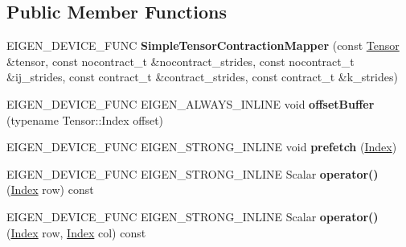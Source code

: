 \subsection*{Public Member Functions}
\begin{DoxyCompactItemize}
\item 
\mbox{\label{class_eigen_1_1internal_1_1_simple_tensor_contraction_mapper_a4804dcac1379d2ac369c498ba78dd17f}} 
E\+I\+G\+E\+N\+\_\+\+D\+E\+V\+I\+C\+E\+\_\+\+F\+U\+NC {\bfseries Simple\+Tensor\+Contraction\+Mapper} (const \hyperlink{class_eigen_1_1_tensor}{Tensor} \&tensor, const nocontract\+\_\+t \&nocontract\+\_\+strides, const nocontract\+\_\+t \&ij\+\_\+strides, const contract\+\_\+t \&contract\+\_\+strides, const contract\+\_\+t \&k\+\_\+strides)
\item 
\mbox{\label{class_eigen_1_1internal_1_1_simple_tensor_contraction_mapper_a8ac62af57a8eda84f7b792c9e98df4b0}} 
E\+I\+G\+E\+N\+\_\+\+D\+E\+V\+I\+C\+E\+\_\+\+F\+U\+NC E\+I\+G\+E\+N\+\_\+\+A\+L\+W\+A\+Y\+S\+\_\+\+I\+N\+L\+I\+NE void {\bfseries offset\+Buffer} (typename Tensor\+::\+Index offset)
\item 
\mbox{\label{class_eigen_1_1internal_1_1_simple_tensor_contraction_mapper_acb247a9e53f1b0d7ba2b8b35ac2ad166}} 
E\+I\+G\+E\+N\+\_\+\+D\+E\+V\+I\+C\+E\+\_\+\+F\+U\+NC E\+I\+G\+E\+N\+\_\+\+S\+T\+R\+O\+N\+G\+\_\+\+I\+N\+L\+I\+NE void {\bfseries prefetch} (\hyperlink{namespace_eigen_a62e77e0933482dafde8fe197d9a2cfde}{Index})
\item 
\mbox{\label{class_eigen_1_1internal_1_1_simple_tensor_contraction_mapper_ae9c096a712b45033172e5012c1f94501}} 
E\+I\+G\+E\+N\+\_\+\+D\+E\+V\+I\+C\+E\+\_\+\+F\+U\+NC E\+I\+G\+E\+N\+\_\+\+S\+T\+R\+O\+N\+G\+\_\+\+I\+N\+L\+I\+NE Scalar {\bfseries operator()} (\hyperlink{namespace_eigen_a62e77e0933482dafde8fe197d9a2cfde}{Index} row) const
\item 
\mbox{\label{class_eigen_1_1internal_1_1_simple_tensor_contraction_mapper_a31d1b85d23a41d89d7bf8d33cf4bf4fd}} 
E\+I\+G\+E\+N\+\_\+\+D\+E\+V\+I\+C\+E\+\_\+\+F\+U\+NC E\+I\+G\+E\+N\+\_\+\+S\+T\+R\+O\+N\+G\+\_\+\+I\+N\+L\+I\+NE Scalar {\bfseries operator()} (\hyperlink{namespace_eigen_a62e77e0933482dafde8fe197d9a2cfde}{Index} row, \hyperlink{namespace_eigen_a62e77e0933482dafde8fe197d9a2cfde}{Index} col) const

\end{DoxyCompactItemize}
